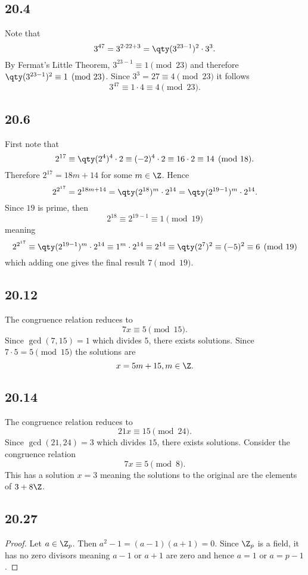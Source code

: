 \documentclass[12pt,titlepage]{extarticle}
\begin{document}

\subsection*{20.4}
Note that
\[
    3^{47} = 3^{2 \cdot 22 + 3} = \qty(3^{23 - 1})^2 \cdot 3^3
.\]
By Fermat's Little Theorem, $3^{23 - 1} \equiv 1 \pmod{23}$ and therefore $\qty(3^{23 - 1})^2 \equiv 1 \pmod{23}$. Since $3^3 = 27 \equiv 4 \pmod{23}$ it follows
\[
    3^{47} \equiv 1 \cdot 4 \equiv 4 \pmod{23}
.\]

\subsection*{20.6}
First note that
\[
    2^{17} \equiv \qty(2^4)^4 \cdot 2 \equiv (-2)^4 \cdot 2 \equiv 16 \cdot 2 \equiv 14 \pmod{18}
.\]
Therefore $2^17 = 18m + 14$ for some $m \in \Z$. Hence
\[
    2^{2^{17}} = 2^{18m + 14} = \qty(2^{18})^m \cdot 2^{14} = \qty(2^{19 - 1})^m \cdot 2^{14}
.\]
Since $19$ is prime, then
\[
    2^{18} \equiv 2^{19 - 1} \equiv 1 \pmod{19}
\]
meaning
\[
    2^{2^{17}} \equiv \qty(2^{19 - 1})^m \cdot 2^{14} \equiv 1^m \cdot 2^{14} \equiv 2^{14} \equiv \qty(2^7)^2 \equiv (-5)^2 \equiv 6 \pmod{19}
\]
which adding one gives the final result $7 \pmod {19}$.

\subsection*{20.12}
The congruence relation reduces to
\[
    7x \equiv 5 \pmod{15}
.\]
Since $\gcd(7,15) = 1$ which divides $5$, there exists solutions. Since $7 \cdot 5 = 5 \pmod{15}$ the solutions are
\[
    x = 5m + 15, m \in \Z
.\]

\subsection*{20.14}
The congruence relation reduces to
\[
    21x \equiv 15 \pmod{24}
.\]
Since $\gcd(21, 24) = 3$ which divides $15$, there exists solutions. Consider the congruence relation
\[
    7x \equiv 5 \pmod{8}
.\]
This has a solution $x = 3$ meaning the solutions to the original are the elements of $3 + 8 \Z$.


\subsection*{20.27}
\begin{proof}
    Let $a \in \Z_p$. Then $a^2 - 1 = (a-1)(a+1) = 0$. Since $\Z_p$ is a field, it has no zero divisors meaning $a-1$ or $a+1$ are zero and hence $a=1$ or $a = p - 1$.
\end{proof}
\end{document}
